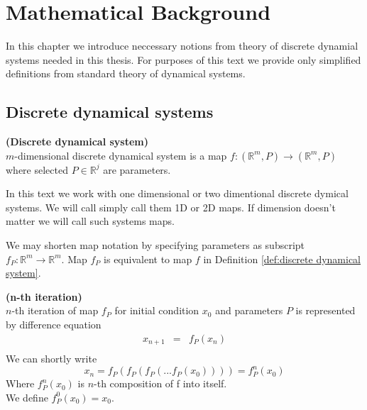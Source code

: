 \chapter{Mathematical Background}
In this chapter we introduce neccessary notions from theory of discrete dynamial systems needed in this thesis.
For purposes of this text we provide only simplified definitions from standard theory of dynamical systems.

\section{Discrete dynamical systems}

\begin{definition} \textbf{(Discrete dynamical system)} \\
    \label{def:discrete dynamical system}
    $m$-dimensional discrete dynamical system is a map $f: (\mathbb{R}^{m}, P) \rightarrow (\mathbb{R}^{m}, P)$ where selected $P \in \mathbb{R}^j$ are parameters.
\end{definition}

\begin{remark}
    In this text we work with one dimensional or two dimentional discrete dymical systems.
    We will call simply call them 1D or 2D maps.
    If dimension doesn't matter we will call such systems maps.
\end{remark}

\begin{remark}
    We may shorten map notation by specifying parameters as subscript $f_P: \mathbb{R}^m \rightarrow \mathbb{R}^m$.
    Map $f_P$ is equivalent to map $f$ in Definition \ref{def:discrete dynamical system}.
\end{remark}

\begin{definition} \textbf{(n-th iteration)} \\
    $n$-th iteration of map $f_P$ for initial condition $x_0$ and parameters $P$ is represented by difference equation
    \begin{eqnarray}
        x_{n+1}  & = & f_P(x_{n}) \\
    \end{eqnarray}
    We can shortly write
    \begin{equation}
        x_{n} = f_P(f_P(f_P(...f_P(x_0)))) = f^{n}_{P}(x_0) \nonumber
    \end{equation}
    Where $f^{n}_{P}(x_0)$ is $n$-th composition of f into itself. \\
    We define $f^{0}_{P}(x_0) = x_0$.
\end{definition}

